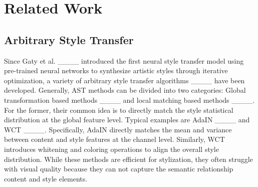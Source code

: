 \section{Related Work}
\label{sec:relatedWork}
\subsection{Arbitrary Style Transfer}
Since Gaty et al. ____ introduced the first neural style transfer model using pre-trained neural networks to synthesize artistic styles through iterative optimization, a variety of arbitrary style transfer algorithms ____ have been developed. Generally, AST methods can be divided into two categories: Global transformation based methods ____ and local matching based methods ____. 
For the former, their common idea is to directly match the style statistical distribution at the global feature level. 
Typical examples are AdaIN ____ and WCT ____. 
Specifically, AdaIN directly matches the mean and variance between content and style features at the channel level. Similarly, WCT introduces whitening and coloring operations to align the overall style distribution. While these methods are efficient for stylization, they often struggle with visual quality because they can not capture the semantic relationship  content and style elements. 

